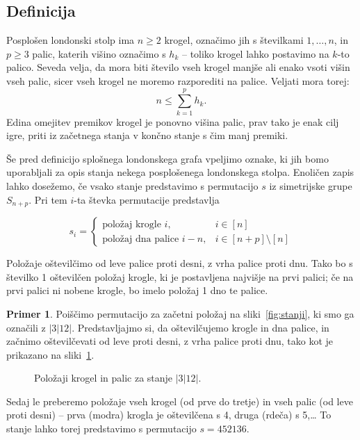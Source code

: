 \documentclass[12pt,a4paper]{amsart}
\theoremstyle{definition} %
\newtheorem{primer}[definicija]{Primer}
\theoremstyle{plain} %
\begin{document}
\subsection{Definicija}

Posplošen londonski stolp ima $n \geq 2$ krogel, označimo jih s številkami $1,\ldots,n$, in $p \geq 3$ palic, katerih višino označimo s $h_k$ -- toliko krogel lahko postavimo na $k$-to palico. Seveda velja, da mora biti število vseh krogel manjše ali enako vsoti višin vseh palic, sicer vseh krogel ne moremo razporediti na palice. Veljati mora torej:
\[ n \leq \sum_{k=1}^{p} h_k.\]
Edina omejitev premikov krogel je ponovno višina palic, prav tako je enak cilj igre, priti iz začetnega stanja v končno stanje s čim manj premiki.

Še pred definicijo splošnega londonskega grafa vpeljimo oznake, ki jih bomo uporabljali za opis stanja nekega posplošenega londonskega stolpa. Enoličen zapis lahko dosežemo, če vsako stanje predstavimo s permutacijo $s$ iz simetrijske grupe $S_{n+p}$. Pri tem $i$-ta števka permutacije predstavlja

\[ s_i =
\begin{cases}
    \text{položaj krogle } i, & i \in [n] \\
    \text{položaj dna palice } i-n, & i \in [n+p] \setminus [n]
\end{cases}
\]

Položaje oštevilčimo od leve palice proti desni, z vrha palice proti dnu. Tako bo s številko 1 oštevilčen položaj krogle, ki je postavljena najvišje na prvi palici; če na prvi palici ni nobene krogle, bo imelo položaj 1 dno te palice.

\begin{primer}
    Poiščimo permutacijo za začetni položaj na sliki~\ref{fig:stanji}, ki smo ga označili z $|3|12|$. 
    Predstavljajmo si, da oštevilčujemo krogle in dna palice, in začnimo oštevilčevati od leve proti desni, z vrha palice proti dnu, tako kot je prikazano na sliki~\ref{fig:ostev-stanji}.
    
    \begin{figure}[h]
        \caption{Položaji krogel in palic za stanje $|3|12|$.}
        \label{fig:ostev-stanji}
    \end{figure}
    
    Sedaj le preberemo položaje vseh krogel (od prve do tretje) in vseh palic (od leve proti desni) -- prva (modra) krogla je oštevilčena s 4, druga (rdeča) s 5,\ldots
    To stanje lahko torej predstavimo s permutacijo $s=452136$.
\end{primer}
\end{document}

